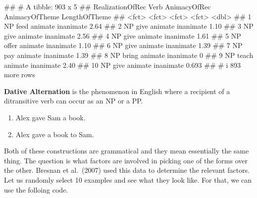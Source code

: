 \documentclass[
]{book}
\newenvironment{Shaded}{\begin{snugshade}}{\end{snugshade}}
\newcommand{\NormalTok}[1]{#1}
\providecommand{\tightlist}{%
  \setlength{\itemsep}{0pt}\setlength{\parskip}{0pt}}
\begin{document}
\begin{Shaded}
\begin{Highlighting}[]
\NormalTok{\#\# \# A tibble: 903 x 5}
\NormalTok{\#\#    RealizationOfRec Verb  AnimacyOfRec AnimacyOfTheme LengthOfTheme}
\NormalTok{\#\#    \textless{}fct\textgreater{}            \textless{}fct\textgreater{} \textless{}fct\textgreater{}        \textless{}fct\textgreater{}                  \textless{}dbl\textgreater{}}
\NormalTok{\#\#  1 NP               feed  animate      inanimate              2.64 }
\NormalTok{\#\#  2 NP               give  animate      inanimate              1.10 }
\NormalTok{\#\#  3 NP               give  animate      inanimate              2.56 }
\NormalTok{\#\#  4 NP               give  animate      inanimate              1.61 }
\NormalTok{\#\#  5 NP               offer animate      inanimate              1.10 }
\NormalTok{\#\#  6 NP               give  animate      inanimate              1.39 }
\NormalTok{\#\#  7 NP               pay   animate      inanimate              1.39 }
\NormalTok{\#\#  8 NP               bring animate      inanimate              0    }
\NormalTok{\#\#  9 NP               teach animate      inanimate              2.40 }
\NormalTok{\#\# 10 NP               give  animate      inanimate              0.693}
\NormalTok{\#\# \# i 893 more rows}
\end{Highlighting}
\end{Shaded}

\textbf{Dative Alternation} is the phenomenon in English where a recipient of a ditransitive verb can occur as an NP or a PP.

\begin{enumerate}
\def\labelenumi{\arabic{enumi}.}
\tightlist
\item
  Alex gave Sam a book.
\item
  Alex gave a book to Sam.
\end{enumerate}

Both of these constructions are grammatical and they mean essentially the same thing. The question is what factors are involved in picking one of the forms over the other. Bresnan et al.~(2007) used this data to determine the relevant factors.
Let us randomly select 10 examples and see what they look like. For that, we can use the folloing code.
\end{document}
